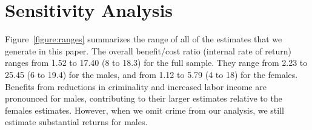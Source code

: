 \section{Sensitivity Analysis} \label{appendix:sensitivity}

\noindent Figure~\ref{figure:ranges} summarizes the range of all of the estimates that we generate in this paper. The overall benefit/cost ratio (internal rate of return) ranges from 1.52 to 17.40 (8 to 18.3) for the full sample. They range from 2.23 to 25.45 (6 to 19.4) for the males, and from 1.12 to 5.79 (4 to 18) for the females. Benefits from reductions in criminality and increased labor income are pronounced for males, contributing to their larger estimates relative to the females estimates. However, when we omit crime from our analysis, we still estimate substantial returns for males.


